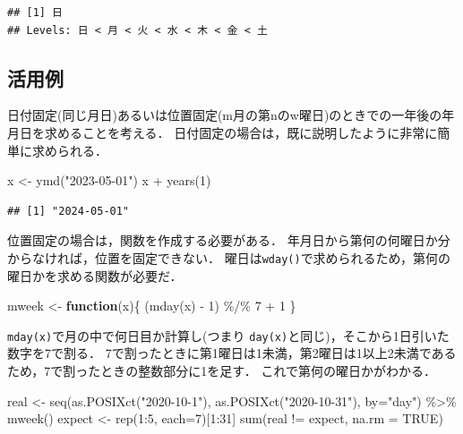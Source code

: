 \documentclass[
]{article}
\newenvironment{Shaded}{\begin{snugshade}}{\end{snugshade}}
\newcommand{\AttributeTok}[1]{\textcolor[rgb]{0.77,0.63,0.00}{#1}}
\newcommand{\ConstantTok}[1]{\textcolor[rgb]{0.00,0.00,0.00}{#1}}
\newcommand{\ControlFlowTok}[1]{\textcolor[rgb]{0.13,0.29,0.53}{\textbf{#1}}}
\newcommand{\DecValTok}[1]{\textcolor[rgb]{0.00,0.00,0.81}{#1}}
\newcommand{\FunctionTok}[1]{\textcolor[rgb]{0.00,0.00,0.00}{#1}}
\newcommand{\NormalTok}[1]{#1}
\newcommand{\OtherTok}[1]{\textcolor[rgb]{0.56,0.35,0.01}{#1}}
\newcommand{\SpecialCharTok}[1]{\textcolor[rgb]{0.00,0.00,0.00}{#1}}
\newcommand{\StringTok}[1]{\textcolor[rgb]{0.31,0.60,0.02}{#1}}
\begin{document}
\begin{verbatim}
## [1] 日
## Levels: 日 < 月 < 火 < 水 < 木 < 金 < 土
\end{verbatim}

\hypertarget{ux6d3bux7528ux4f8b}{%
\subsection{活用例}\label{ux6d3bux7528ux4f8b}}

日付固定(同じ月日)あるいは位置固定(m月の第nのw曜日)のときでの一年後の年月日を求めることを考える．
日付固定の場合は，既に説明したように非常に簡単に求められる．

\begin{Shaded}
\begin{Highlighting}[]
\NormalTok{x }\OtherTok{\textless{}{-}} \FunctionTok{ymd}\NormalTok{(}\StringTok{"2023{-}05{-}01"}\NormalTok{)}
\NormalTok{x }\SpecialCharTok{+} \FunctionTok{years}\NormalTok{(}\DecValTok{1}\NormalTok{)}
\end{Highlighting}
\end{Shaded}

\begin{verbatim}
## [1] "2024-05-01"
\end{verbatim}

位置固定の場合は，関数を作成する必要がある．
年月日から第何の何曜日か分からなければ，位置を固定できない．
曜日は\texttt{wday()}で求められるため，第何の曜日かを求める関数が必要だ．

\begin{Shaded}
\begin{Highlighting}[]
\NormalTok{mweek }\OtherTok{\textless{}{-}} \ControlFlowTok{function}\NormalTok{(x)\{}
\NormalTok{  (}\FunctionTok{mday}\NormalTok{(x) }\SpecialCharTok{{-}} \DecValTok{1}\NormalTok{) }\SpecialCharTok{\%/\%} \DecValTok{7} \SpecialCharTok{+} \DecValTok{1}
\NormalTok{\}}
\end{Highlighting}
\end{Shaded}

\texttt{mday(x)}で月の中で何日目か計算し(つまり \texttt{day(x)}と同じ)，そこから1日引いた数字を7で割る．
7で割ったときに第1曜日は1未満，第2曜日は1以上2未満であるため，7で割ったときの整数部分に1を足す．
これで第何の曜日かがわかる．

\begin{Shaded}
\begin{Highlighting}[]
\NormalTok{real    }\OtherTok{\textless{}{-}} \FunctionTok{seq}\NormalTok{(}\FunctionTok{as.POSIXct}\NormalTok{(}\StringTok{"2020{-}10{-}1"}\NormalTok{), }\FunctionTok{as.POSIXct}\NormalTok{(}\StringTok{"2020{-}10{-}31"}\NormalTok{), }\AttributeTok{by=}\StringTok{"day"}\NormalTok{) }\SpecialCharTok{\%\textgreater{}\%} \FunctionTok{mweek}\NormalTok{()}
\NormalTok{expect }\OtherTok{\textless{}{-}} \FunctionTok{rep}\NormalTok{(}\DecValTok{1}\SpecialCharTok{:}\DecValTok{5}\NormalTok{, }\AttributeTok{each=}\DecValTok{7}\NormalTok{)[}\DecValTok{1}\SpecialCharTok{:}\DecValTok{31}\NormalTok{]}
\FunctionTok{sum}\NormalTok{(real }\SpecialCharTok{!=}\NormalTok{ expect, }\AttributeTok{na.rm =} \ConstantTok{TRUE}\NormalTok{)}
\end{Highlighting}
\end{Shaded}
\end{document}
